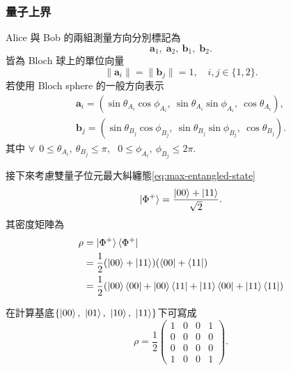\documentclass[12pt, a4paper, twoside, reqno]{article}
\begin{document}
\subsubsection{量子上界}
Alice 與 Bob 的兩組測量方向分別標記為
\[
    \bm{a}_1,\;\bm{a}_2,~\bm{b}_1,\;\bm{b}_2.
\]
\noindent 皆為 Bloch 球上的單位向量
\[
  \lVert \bm{a}_i \rVert
  = \lVert \bm{b}_j \rVert
  = 1,
  \quad i,j \in \{1,2\}.
  \label{eq:measurement-directions}
\]
\noindent 若使用 Bloch sphere 的一般方向表示
\begin{equation}
\begin{aligned}
    \bm{a}_i = (\sin\theta_{A_i}\cos\phi_{A_i},~
    \sin\theta_{A_i}\sin\phi_{A_i},~
    \cos\theta_{A_i}),
    \\
    \bm{b}_j = (\sin\theta_{B_j}\cos\phi_{B_j},~
    \sin\theta_{B_j}\sin\phi_{B_j},~
    \cos\theta_{B_j}).
\end{aligned}
\label{eq:bloch-coordinate}
\end{equation}
\noindent 其中 $\forall ~~0\leq\theta_{A_i},~\theta_{B_j}\leq\pi,~~~0\leq\phi_{A_i},~\phi_{B_j}\leq 2\pi$.

接下來考慮雙量子位元最大糾纏態\eqref{eq:max-entangled-state}
\[
    \ket{\Phi^+}
    =
    \frac{\ket{00}+\ket{11}}{\sqrt{2}}.
    \label{eq:max-entangled-state2}
\]
\noindent 其密度矩陣為
\begin{equation}
\begin{aligned}
    \rho 
    &= \ket{\Phi^+}\bra{\Phi^+}\\
    &= \frac{1}{2}(\ket{00}+\ket{11})(\bra{00}+\bra{11})\\
    &= \frac{1}{2}(\ket{00}\bra{00}+\ket{00}\bra{11}+\ket{11}\bra{00}+\ket{11}\bra{11})
    \label{eq:bellstate-density-rho}
\end{aligned}
\end{equation}

\noindent 在計算基底$\{\ket{00},~\ket{01},~\ket{10},~\ket{11}\}$下可寫成
\begin{equation}
    \rho = \frac{1}{2}
    \begin{pmatrix}
        1 & 0 & 0 & 1 \\
        0 & 0 & 0 & 0 \\
        0 & 0 & 0 & 0 \\
        1 & 0 & 0 & 1 
    \end{pmatrix}.
    \label{eq:bellstate-density-matrix}
\end{equation}
\end{document}
